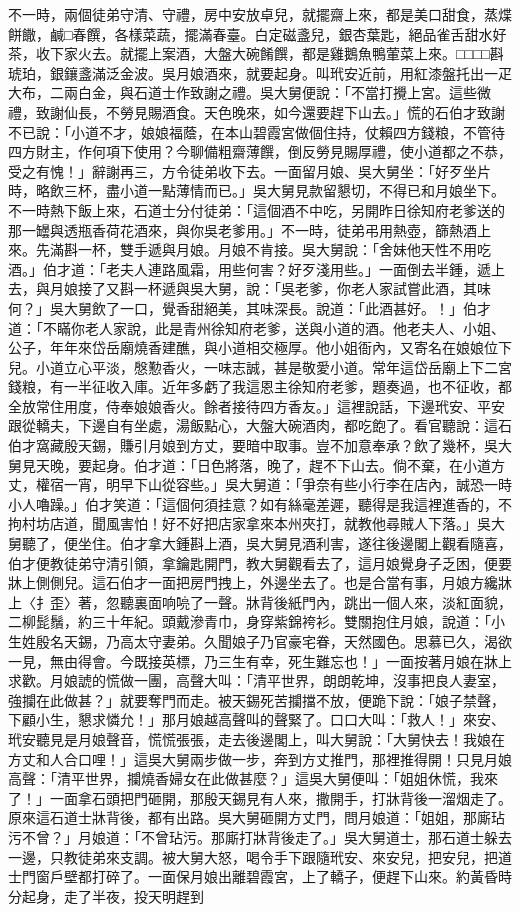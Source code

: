 不一時，兩個徒弟守清、守禮，房中安放卓兒，就擺齋上來，都是美口甜食，蒸煠餅饊，鹹□春饌，各樣菜蔬，擺滿春臺。白定磁盞兒，銀杏葉匙，絕品雀舌甜水好茶，收下家火去。就擺上案酒，大盤大碗餚饌，都是雞鵝魚鴨葷菜上來。□□□□斟琥珀，銀鑲盞滿泛金波。吳月娘酒來，就要起身。叫玳安近前，用紅漆盤托出一疋大布，二兩白金，與石道士作致謝之禮。吳大舅便說：「不當打攪上宮。這些微禮，致謝仙長，不勞見賜酒食。天色晚來，如今還要趕下山去。」慌的石伯才致謝不已說：「小道不才，娘娘福蔭，在本山碧霞宮做個住持，仗賴四方錢粮，不管待四方財主，作何項下使用？今聊備粗齋薄饌，倒反勞見賜厚禮，使小道都之不恭，受之有愧！」辭謝再三，方令徒弟收下去。一面留月娘、吳大舅坐：「好歹坐片時，略飲三杯，盡小道一點薄情而已。」吳大舅見款留懇切，不得已和月娘坐下。不一時熱下飯上來，石道士分付徒弟：「這個酒不中吃，另開昨日徐知府老爹送的那一罎與透瓶香荷花酒來，與你吳老爹用。」不一時，徒弟弔用熱壺，篩熱酒上來。先滿斟一杯，雙手遞與月娘。月娘不肯接。吳大舅說：「舍妹他天性不用吃酒。」伯才道：「老夫人連路風霜，用些何害？好歹淺用些。」一面倒去半鍾，遞上去，與月娘接了又斟一杯遞與吳大舅，說：「吳老爹，你老人家試嘗此酒，其味何？」吳大舅飲了一口，覺香甜絕美，其味深長。說道：「此酒甚好。！」伯才道：「不瞞你老人家說，此是青州徐知府老爹，送與小道的酒。他老夫人、小姐、公子，年年來岱岳廟燒香建醮，與小道相交極厚。他小姐衙內，又寄名在娘娘位下兒。小道立心平淡，慇懃香火，一味志誠，甚是敬愛小道。常年這岱岳廟上下二宮錢粮，有一半征收入庫。近年多虧了我這恩主徐知府老爹，題奏過，也不征收，都全放常住用度，侍奉娘娘香火。餘者接待四方香友。」這裡說話，下邊玳安、平安跟從轎夫，下邊自有坐處，湯飯點心，大盤大碗酒肉，都吃飽了。看官聽說：這石伯才窩藏殷天錫，賺引月娘到方丈，要暗中取事。豈不加意奉承？飲了幾杯，吳大舅見天晚，要起身。伯才道：「日色將落，晚了，趕不下山去。倘不棄，在小道方丈，權宿一宵，明早下山從容些。」吳大舅道：「爭奈有些小行李在店內，誠恐一時小人嚕躁。」伯才笑道：「這個何須挂意？如有絲毫差遲，聽得是我這裡進香的，不拘村坊店道，聞風害怕！好不好把店家拿來本州夾打，就教他尋賊人下落。」吳大舅聽了，便坐住。伯才拿大鍾斟上酒，吳大舅見酒利害，遂往後邊閣上觀看隨喜，伯才便教徒弟守清引領，拿鑰匙開門，教大舅觀看去了，這月娘覺身子乏困，便要牀上側側兒。這石伯才一面把房門拽上，外邊坐去了。也是合當有事，月娘方纔牀上〈扌歪〉著，忽聽裏面响喨了一聲。牀背後紙門內，跳出一個人來，淡紅面貌，二柳髭鬚，約三十年紀。頭戴滲青巾，身穿紫錦袴衫。雙關抱住月娘，說道：「小生姓殷名天錫，乃高太守妻弟。久聞娘子乃官豪宅眷，天然國色。思慕已久，渴欲一見，無由得會。今既接英標，乃三生有幸，死生難忘也！」一面按著月娘在牀上求歡。月娘諕的慌做一團，高聲大叫：「清平世界，朗朗乾坤，沒事把良人妻室，強攔在此做甚？」就要奪門而走。被天錫死苦攔擋不放，便跪下說：「娘子禁聲，下顧小生，懇求憐允！」那月娘越高聲叫的聲緊了。口口大叫：「救人！」來安、玳安聽見是月娘聲音，慌慌張張，走去後邊閣上，叫大舅說：「大舅快去！我娘在方丈和人合口哩！」這吳大舅兩步做一步，奔到方丈推門，那裡推得開！只見月娘高聲：「清平世界，攔燒香婦女在此做甚麼？」這吳大舅便叫：「姐姐休慌，我來了！」一面拿石頭把門砸開，那殷天錫見有人來，撒開手，打牀背後一溜烟走了。原來這石道士牀背後，都有出路。吳大舅砸開方丈門，問月娘道：「姐姐，那廝玷污不曾？」月娘道：「不曾玷污。那廝打牀背後走了。」吳大舅道士，那石道士躲去一邊，只教徒弟來支調。被大舅大怒，喝令手下跟隨玳安、來安兒，把安兒，把道士門窗戶壁都打碎了。一面保月娘出離碧霞宮，上了轎子，便趕下山來。約黃昏時分起身，走了半夜，投天明趕到